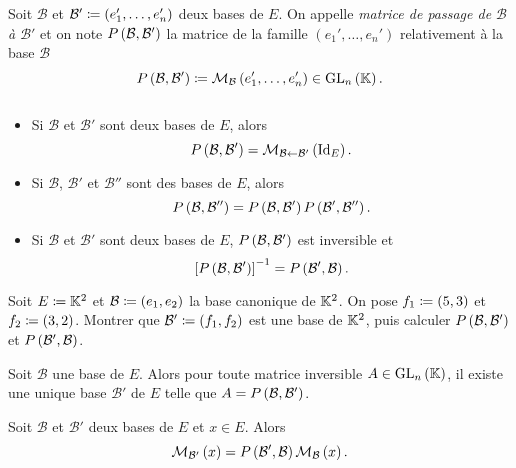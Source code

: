 \documentclass{magnolia}
\begin{document}
\begin{definition}[utile=-3]
Soit $\mathcal{B}$ et \mbox{$\mathcal{B}'\coloneqq(e_1',\ldots,e_n')$} deux bases de $E$.
On appelle \emph{matrice de passage de $\mathcal{B}$ à $\mathcal{B}'$} et on note
$P\left(\mathcal{B},\mathcal{B}'\right)$ la matrice de la famille $(e_1',\ldots,e_n')$
relativement à la base $\mathcal{B}$
\[P\left(\mathcal{B},\mathcal{B}'\right)\coloneqq\mathcal{M}_{\mathcal{B}}\left(e_1',\ldots,e_n'\right)\in{\rm GL}_{n}\left(\mathbb{K}\right).\]
\end{definition}

\begin{proposition}[utile=-3]
$\quad$
\begin{itemize}
\item Si $\mathcal{B}$ et $\mathcal{B}'$ sont deux bases de $E$, alors
  \[P\left(\mathcal{B},\mathcal{B}'\right)=\mathcal{M}_{\mathcal{B}\gets\mathcal{B}'}\left(\operatorname{Id}_E\right).\]
\item Si $\mathcal{B}$, $\mathcal{B}'$ et $\mathcal{B}''$ sont des bases de
  $E$, alors
  \[P\left(\mathcal{B},\mathcal{B}''\right)=P\left(\mathcal{B},\mathcal{B}'\right)
    P\left(\mathcal{B}',\mathcal{B}''\right).\]
\item Si $\mathcal{B}$ et $\mathcal{B}'$ sont deux bases de $E$,
  $P\left(\mathcal{B},\mathcal{B}'\right)$ est inversible et
  \[\left[P\left(\mathcal{B},\mathcal{B}'\right)\right]^{-1}=P\left(\mathcal{B}',\mathcal{B}\right).\]
\end{itemize}
\end{proposition}

\begin{exoUnique}
\exo Soit $E\coloneqq\mathbb{K}^2$ et $\mathcal{B}\coloneqq(e_1,e_2)$ la base canonique de $\mathbb{K}^2$.
  On pose $f_1\coloneqq\left(5,3\right)$ et $f_2\coloneqq\left(3,2\right)$. Montrer que $\mathcal{B}'\coloneqq(f_1,f_2)$
  est une base de $\mathbb{K}^2$, puis calculer $P\left(\mathcal{B},\mathcal{B}'\right)$ et
  $P\left(\mathcal{B}',\mathcal{B}\right)$.
\end{exoUnique}

\begin{proposition}[utile=-3]
Soit $\mathcal{B}$ une base de $E$. Alors
pour toute matrice inversible $A\in{\rm GL}_{n}\left(\mathbb{K}\right)$, il existe une unique base
$\mathcal{B}'$ de $E$ telle que $A=P\left(\mathcal{B},\mathcal{B}'\right)$.
\end{proposition}

\begin{proposition}[utile=-3]
Soit $\mathcal{B}$ et $\mathcal{B}'$ deux bases de $E$ et $x\in E$. Alors
\[\mathcal{M}_{\mathcal{B}'}\left(x\right)=P\left(\mathcal{B}',\mathcal{B}\right)\mathcal{M}_{\mathcal{B}}\left(x\right).\]
\end{proposition}
\end{document}
